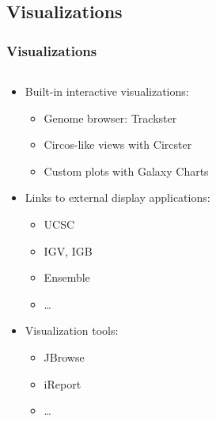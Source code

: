 \documentclass{beamer}              %
\begin{document}
\begin{frame}
\begin{columns}[T]
\begin{column}{.18\textwidth}
    \end{column}
  \end{columns}
\end{frame}
	

\subsection{Visualizations}
\begin{frame}
\frametitle{Visualizations}
  \begin{columns}[T]
    \begin{column}{.72\textwidth}
	\begin{itemize}
	\item Built-in interactive visualizations:
		\begin{itemize}
		\item Genome browser: Trackster
		\item Circos-like views with Circster
		\item Custom plots with Galaxy Charts
		\end{itemize}
	\item Links to external display applications:
		\begin{itemize}
			\item UCSC
 			\item IGV, IGB
 			\item Ensemble
 			\item \ldots
		\end{itemize}
		\item Visualization tools:
		\begin{itemize}
			\item JBrowse
 			\item iReport
 			\item \ldots
		\end{itemize}
	\end{itemize}
    \end{column}
    \begin{column}{.28\textwidth}

\end{column}
\end{columns}
\end{frame}
\end{document}
